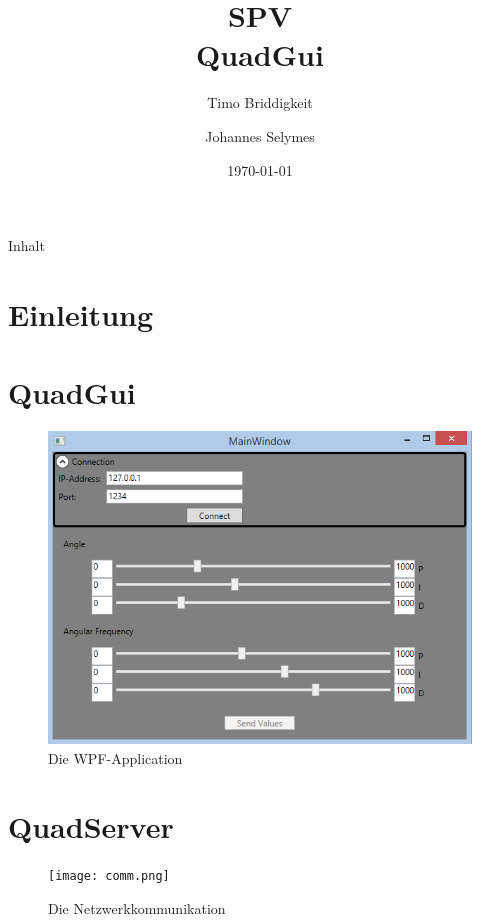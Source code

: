 \documentclass[11pt]{beamer}
\author{Timo Briddigkeit \and Johannes Selymes}
\title{SPV\\QuadGui}
\date{\today}
\begin{document}
\begin{frame}
\titlepage
\end{frame}

\begin{frame}{Inhalt}
\tableofcontents
\end{frame}

\section{Einleitung}
\section{QuadGui}
\begin{frame}
\begin{figure}
\centering
\includegraphics[scale=0.5]{gui.png} 
\caption{Die WPF-Application}
\end{figure}
\end{frame}
\section{QuadServer}
\begin{frame}
\begin{figure}
\centering
\texttt{[image: comm.png]} 
\caption{Die Netzwerkkommunikation}
\end{figure}
\end{frame}
\end{document}
